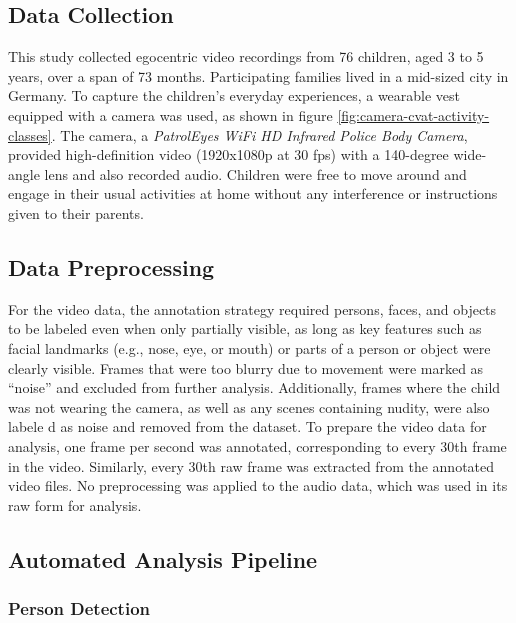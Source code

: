 \documentclass[
  man,floatsintext]{apa6}
\begin{document}
\subsection{Data Collection}\label{data-collection}

This study collected egocentric video recordings from 76 children, aged 3 to 5 years, over a span of 73 months. Participating families lived in a mid-sized city in Germany. To capture the children's everyday experiences, a wearable vest equipped with a camera was used, as shown in figure \ref{fig:camera-cvat-activity-classes}. The camera, a \emph{PatrolEyes WiFi HD Infrared Police Body Camera}, provided high-definition video (1920x1080p at 30 fps) with a 140-degree wide-angle lens and also recorded audio. Children were free to move around and engage in their usual activities at home without any interference or instructions given to their parents.

\subsection{Data Preprocessing}\label{data-preprocessing}

For the video data, the annotation strategy required persons, faces, and objects to be labeled even when only partially visible, as long as key features such as facial landmarks (e.g., nose, eye, or mouth) or parts of a person or object were clearly visible. Frames that were too blurry due to movement were marked as ``noise'' and excluded from further analysis. Additionally, frames where the child was not wearing the camera, as well as any scenes containing nudity, were also labele d as noise and removed from the dataset. To prepare the video data for analysis, one frame per second was annotated, corresponding to every 30th frame in the video. Similarly, every 30th raw frame was extracted from the annotated video files. No preprocessing was applied to the audio data, which was used in its raw form for analysis.

\subsection{Automated Analysis Pipeline}\label{automated-analysis-pipeline}

\subsubsection{Person Detection}\label{person-detection}
\end{document}
